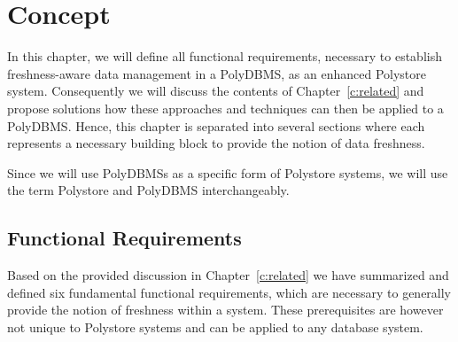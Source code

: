 \chapter{Concept}
\label{c:concept}


In this chapter, we will define all functional requirements, necessary to establish freshness-aware data management in a PolyDBMS, as an enhanced Polystore system.
Consequently we will discuss the contents of Chapter~\ref{c:related} and propose solutions how these approaches and techniques can then be applied to a PolyDBMS.
Hence, this chapter is separated into several sections where each represents a necessary building block to provide the notion of data freshness.


Since we will use PolyDBMSs as a specific form of Polystore systems, we will use the term Polystore and PolyDBMS interchangeably.

\section{Functional Requirements}

Based on the provided discussion in Chapter~\ref{c:related} we have summarized and defined six fundamental functional
requirements, which are necessary to  generally provide the notion of freshness within a system.
These prerequisites are however not unique to Polystore systems and can be applied to any database system. 

